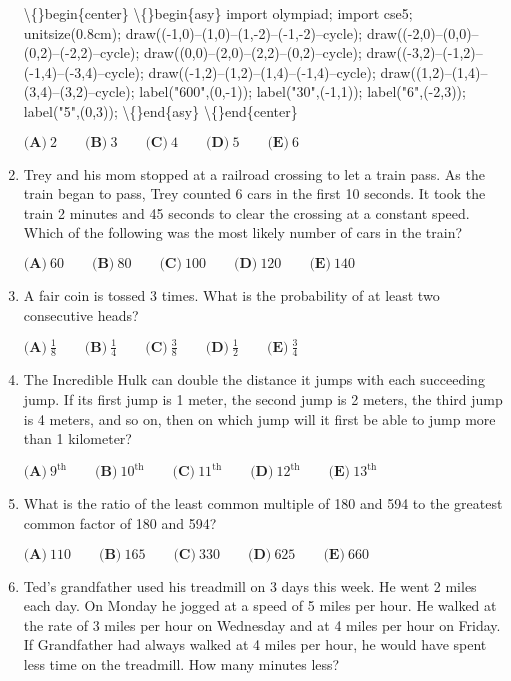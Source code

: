 \documentclass{article}
\begin{document}
\begin{enumerate}[label=\arabic*., itemsep=0.5em]
\textbackslash\{\}begin\{center\}
\textbackslash\{\}begin\{asy\}
import olympiad;
import cse5;
unitsize(0.8cm);
draw((-1,0)--(1,0)--(1,-2)--(-1,-2)--cycle);
draw((-2,0)--(0,0)--(0,2)--(-2,2)--cycle);
draw((0,0)--(2,0)--(2,2)--(0,2)--cycle);
draw((-3,2)--(-1,2)--(-1,4)--(-3,4)--cycle);
draw((-1,2)--(1,2)--(1,4)--(-1,4)--cycle);
draw((1,2)--(1,4)--(3,4)--(3,2)--cycle);
label("600",(0,-1));
label("30",(-1,1));
label("6",(-2,3));
label("5",(0,3));
\textbackslash\{\}end\{asy\}
\textbackslash\{\}end\{center\}


\(\textbf{(A)}\ 2 \qquad \textbf{(B)}\ 3 \qquad \textbf{(C)}\ 4 \qquad \textbf{(D)}\ 5 \qquad \textbf{(E)}\ 6\)\par \vspace{0.5em}\item Trey and his mom stopped at a railroad crossing to let a train pass. As the train began to pass, Trey counted 6 cars in the first 10 seconds. It took the train 2 minutes and 45 seconds to clear the crossing at a constant speed. Which of the following was the most likely number of cars in the train?

\(\textbf{(A)}\ 60 \qquad \textbf{(B)}\ 80 \qquad \textbf{(C)}\ 100 \qquad \textbf{(D)}\ 120 \qquad \textbf{(E)}\ 140\)\par \vspace{0.5em}\item A fair coin is tossed 3 times. What is the probability of at least two consecutive heads?

\(\textbf{(A)}\ \frac18 \qquad \textbf{(B)}\ \frac14 \qquad \textbf{(C)}\ \frac38 \qquad \textbf{(D)}\ \frac12 \qquad \textbf{(E)}\ \frac34\)\par \vspace{0.5em}\item The Incredible Hulk can double the distance it jumps with each succeeding jump. If its first jump is 1 meter, the second jump is 2 meters, the third jump is 4 meters, and so on, then on which jump will it first be able to jump more than 1 kilometer?

\(\textbf{(A)}\ 9^\text{th} \qquad \textbf{(B)}\ 10^\text{th} \qquad \textbf{(C)}\ 11^\text{th} \qquad \textbf{(D)}\ 12^\text{th} \qquad \textbf{(E)}\ 13^\text{th}\)\par \vspace{0.5em}\item What is the ratio of the least common multiple of 180 and 594 to the greatest common factor of 180 and 594?

\(\textbf{(A)}\ 110 \qquad \textbf{(B)}\ 165 \qquad \textbf{(C)}\ 330 \qquad \textbf{(D)}\ 625 \qquad \textbf{(E)}\ 660\)\par \vspace{0.5em}\item Ted's grandfather used his treadmill on 3 days this week. He went 2 miles each day. On Monday he jogged at a speed of 5 miles per hour. He walked at the rate of 3 miles per hour on Wednesday and at 4 miles per hour on Friday. If Grandfather had always walked at 4 miles per hour, he would have spent less time on the treadmill. How many minutes less?


\end{enumerate}
\end{document}
